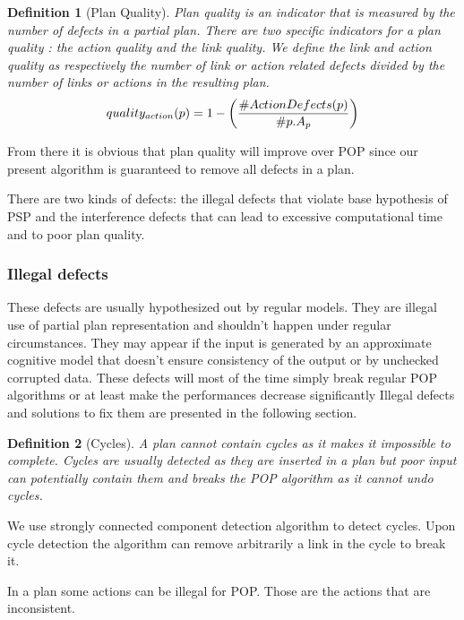 \documentclass[]{article}
\newtheorem{definition}{Definition}
\begin{document}
\begin{definition}[Plan Quality]

Plan quality is an indicator that is measured by the number of defects
in a partial plan. There are two specific indicators for a plan quality
: the action quality and the link quality. We define the link and action
quality as respectively the number of link or action related defects
divided by the number of links or actions in the resulting plan.
\[quality_{action}(p) =  1 - \left( \#ActionDefects(p) \over \#p.A_p \right)\]

\end{definition}

From there it is obvious that plan quality will improve over POP since
our present algorithm is guaranteed to remove all defects in a plan.

There are two kinds of defects: the illegal defects that violate base
hypothesis of PSP and the interference defects that can lead to
excessive computational time and to poor plan quality.

\subsubsection{Illegal defects}\label{illegal-defects}

These defects are usually hypothesized out by regular models. They are
illegal use of partial plan representation and shouldn't happen under
regular circumstances. They may appear if the input is generated by an
approximate cognitive model that doesn't ensure consistency of the
output or by unchecked corrupted data. These defects will most of the
time simply break regular POP algorithms or at least make the
performances decrease significantly Illegal defects and solutions to fix
them are presented in the following section.

\begin{definition}[Cycles]

A plan cannot contain cycles as it makes it impossible to complete.
Cycles are usually detected as they are inserted in a plan but poor
input can potentially contain them and breaks the POP algorithm as it
cannot undo cycles.

\end{definition}

We use strongly connected component detection algorithm to detect
cycles. Upon cycle detection the algorithm can remove arbitrarily a link
in the cycle to break it.

In a plan some actions can be illegal for POP. Those are the actions
that are inconsistent.
\end{document}
